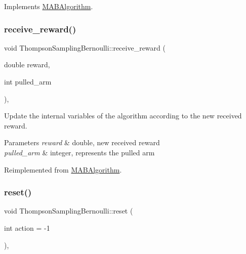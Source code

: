 Implements \mbox{\hyperlink{class_m_a_b_algorithm_afb48f01df0e1860d19759f6e20335007}{M\+A\+B\+Algorithm}}.

\mbox{\label{class_thompson_sampling_bernoulli_a02d2aabd642f0b1149963539178f2a1e}} 
\subsubsection{\texorpdfstring{receive\+\_\+reward()}{receive\_reward()}}
{\footnotesize\ttfamily void Thompson\+Sampling\+Bernoulli\+::receive\+\_\+reward (\begin{DoxyParamCaption}\item[{double}]{reward,  }\item[{int}]{pulled\+\_\+arm }\end{DoxyParamCaption})\hspace{0.3cm}{\ttfamily [override]}, {\ttfamily [virtual]}}



Update the internal variables of the algorithm according to the new received reward. 


\begin{DoxyParams}{Parameters}
{\em reward} & double, new received reward \\
\hline
{\em pulled\+\_\+arm} & integer, represents the pulled arm \\
\hline
\end{DoxyParams}


Reimplemented from \mbox{\hyperlink{class_m_a_b_algorithm_aa584b3d6b86fa050e3389be9781b5782}{M\+A\+B\+Algorithm}}.

\mbox{\label{class_thompson_sampling_bernoulli_abb2e2c252333090ac1bd63e4297e99ba}} 
\subsubsection{\texorpdfstring{reset()}{reset()}}
{\footnotesize\ttfamily void Thompson\+Sampling\+Bernoulli\+::reset (\begin{DoxyParamCaption}\item[{int}]{action = {\ttfamily -\/1} }\end{DoxyParamCaption})\hspace{0.3cm}{\ttfamily [override]}, {\ttfamily [virtual]}}



